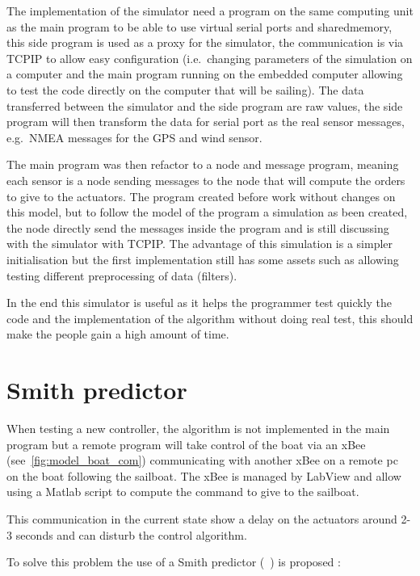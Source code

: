 The implementation of the simulator need a program on the same computing unit as the main program to be able to use virtual serial ports and \gls{sharedmemory}, this side program is used as a proxy for the simulator, the communication is via \gls{TCPIP} to allow easy configuration (i.e.\ changing parameters of the simulation on a computer and the main program running on the embedded computer allowing to test the code directly on the computer that will be sailing).
The data transferred between the simulator and the side program are raw values, the side program will 
then transform the data for serial port as the real sensor messages, e.g.\ \gls{NMEA} messages for the GPS and 
wind sensor.

The main program was then refactor to a node and message program, meaning each sensor is a node sending messages to the node that will compute the orders to give to the actuators. The program created before work without changes on this model, but to follow the model of the program a simulation as been created, the node directly send the messages inside the program and is still discussing with the simulator with \gls{TCPIP}.
The advantage of this simulation is a simpler initialisation but the first implementation still has some assets such as allowing testing different preprocessing of data (filters).

In the end this simulator is useful as it helps the programmer test quickly the code and the implementation of the algorithm without doing real test, this should make the people gain a high amount of time.



\section{Smith predictor}

When testing a new controller, the algorithm is not implemented in the main program but a remote program will take control of the boat via an xBee (see~\ref{fig:model_boat_com}) communicating with another xBee on a remote pc on the boat following the sailboat. The xBee is managed by LabView and allow using a Matlab script to compute the command to give to the sailboat.

This communication in the current state show a delay on the actuators around 2-3 seconds and can disturb the control algorithm.

To solve this problem the use of a Smith predictor (~\cite{smith1959controller}) is proposed :

